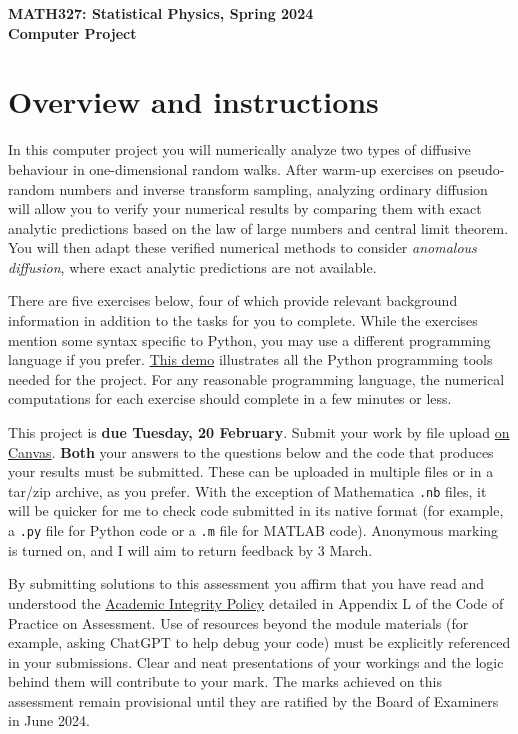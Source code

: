 \documentclass[12 pt]{article} %
\begin{document}
\newcommand{\thisunit}{MATH327 Project}
\newcommand{\moddate}{Last modified 4 Feb.~2024}
\begin{center}
  {\Large \textbf{MATH327: Statistical Physics, Spring 2024}} \\[12 pt]
  {\Large \textbf{Computer Project}} \\[24 pt]
\end{center}

\section*{Overview and instructions}
In this computer project you will numerically analyze two types of diffusive behaviour in one-dimensional random walks.
After warm-up exercises on pseudo-random numbers and inverse transform sampling, analyzing ordinary diffusion will allow you to verify your numerical results by comparing them with exact analytic predictions based on the law of large numbers and central limit theorem.
You will then adapt these verified numerical methods to consider \textit{anomalous diffusion}, where exact analytic predictions are not available.

There are five exercises below, four of which provide relevant background information in addition to the tasks for you to complete.
While the exercises mention some syntax specific to Python, you may use a different programming language if you prefer.
\href{https://tinyurl.com/math327demo}{This demo} illustrates all the Python programming tools needed for the project.
For any reasonable programming language, the numerical computations for each exercise should complete in a few minutes or less.

This project is \textbf{due Tuesday, 20 February}.
Submit your work by file upload \href{https://canvas.liverpool.ac.uk/courses/69036/assignments/263364}{on Canvas}.
\textbf{Both} your answers to the questions below and the code that produces your results must be submitted.
These can be uploaded in multiple files or in a tar/zip archive, as you prefer.
With the exception of Mathematica \texttt{.nb} files, it will be quicker for me to check code submitted in its native format (for example, a \texttt{.py} file for Python code or a \texttt{.m} file for MATLAB code).
Anonymous marking is turned on, and I will aim to return feedback by 3 March.

By submitting solutions to this assessment you affirm that you have read and understood the \href{https://www.liverpool.ac.uk/media/livacuk/tqsd/code-of-practice-on-assessment/appendix_L_cop_assess.pdf}{Academic Integrity Policy} detailed in Appendix L of the Code of Practice on Assessment.
Use of resources beyond the module materials (for example, asking ChatGPT to help debug your code) must be explicitly referenced in your submissions.
Clear and neat presentations of your workings and the logic behind them will contribute to your mark.
The marks achieved on this assessment remain provisional until they are ratified by the Board of Examiners in June 2024.
\end{document}
